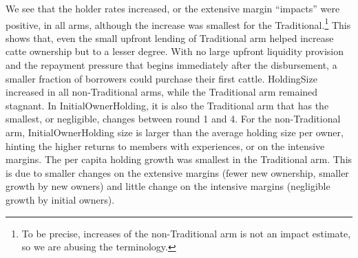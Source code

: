 	We see that the holder rates increased, or the extensive margin ``impacts'' were positive, in all arms, although the increase was smallest for the \textsf{Traditional}.\footnote{To be precise, increases of the non-\textsf{Traditional} arm is not an impact estimate, so we are abusing the terminology. } This shows that, even the small upfront lending of \textsf{Traditional} arm helped increase catte ownership but to a lesser degree. With no large upfront liquidity provision and the repayment pressure that begins immediately after the disbursement, a smaller fraction of borrowers could purchase their first cattle. \textsf{HoldingSize} increased in all non-\textsf{Traditional} arms, while the \textsf{Traditional} arm remained stagnant. In \textsf{InitialOwnerHolding}, it is also the \textsf{Traditional} arm that has the smallest, or negligible, changes between round 1 and 4. For the non-\textsf{Traditional} arm, \textsf{InitialOwnerHolding} size is larger than the average holding size per owner, hinting the higher returns to members with experiences, or on the intensive margins. The per capita holding growth was smallest in the \textsf{Traditional} arm. This is due to smaller changes on the extensive margins (fewer new ownership, smaller growth by new owners) and little change on the intensive margins (negligible growth by initial owners). 


\begin{figure}
\end{figure}


